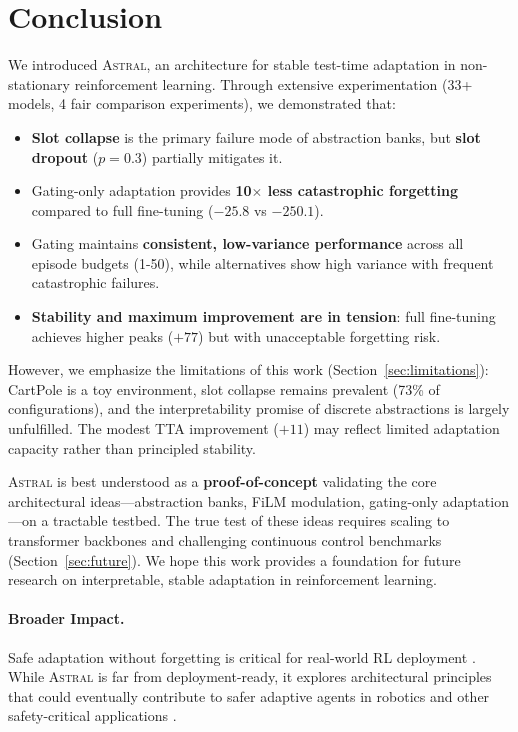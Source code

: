 \documentclass{article}
\newcommand{\astral}{\textsc{Astral}}
\newcommand{\method}{\astral}
\begin{document}
\section{Conclusion}
\label{sec:conclusion}

We introduced \method{}, an architecture for stable test-time adaptation in non-stationary reinforcement learning. Through extensive experimentation (33+ models, 4 fair comparison experiments), we demonstrated that:

\begin{itemize}
    \item \textbf{Slot collapse} is the primary failure mode of abstraction banks, but \textbf{slot dropout} ($p=0.3$) partially mitigates it.
    \item Gating-only adaptation provides \textbf{10$\times$ less catastrophic forgetting} compared to full fine-tuning ($-25.8$ vs $-250.1$).
    \item Gating maintains \textbf{consistent, low-variance performance} across all episode budgets (1-50), while alternatives show high variance with frequent catastrophic failures.
    \item \textbf{Stability and maximum improvement are in tension}: full fine-tuning achieves higher peaks ($+77$) but with unacceptable forgetting risk.
\end{itemize}

However, we emphasize the limitations of this work (Section~\ref{sec:limitations}): CartPole is a toy environment, slot collapse remains prevalent (73\% of configurations), and the interpretability promise of discrete abstractions is largely unfulfilled. The modest TTA improvement ($+11$) may reflect limited adaptation capacity rather than principled stability.

\method{} is best understood as a \textbf{proof-of-concept} validating the core architectural ideas---abstraction banks, FiLM modulation, gating-only adaptation---on a tractable testbed. The true test of these ideas requires scaling to transformer backbones and challenging continuous control benchmarks (Section~\ref{sec:future}). We hope this work provides a foundation for future research on interpretable, stable adaptation in reinforcement learning.

\paragraph{Broader Impact.} Safe adaptation without forgetting is critical for real-world RL deployment \citep{kumar2021rma}. While \method{} is far from deployment-ready, it explores architectural principles that could eventually contribute to safer adaptive agents in robotics \citep{tobin2017domain} and other safety-critical applications \citep{verma2018programmatically}.
\end{document}
